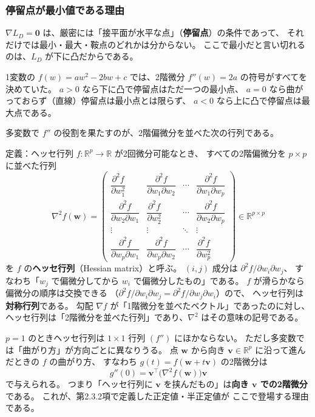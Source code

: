 \subsubsection{停留点が最小値である理由}

$\nabla L_D = \bm{0}$ は、厳密には「接平面が水平な点」（\textbf{停留点}）の条件であって、
それだけでは最小・最大・鞍点のどれかは分からない。
ここで最小だと言い切れるのは、$L_D$ が下に凸だからである。

1変数の $f(w) = aw^2 - 2bw + c$ では、2階微分 $f''(w) = 2a$ の符号がすべてを決めていた。
$a > 0$ なら下に凸で停留点はただ一つの最小点、
$a = 0$ なら曲がっておらず（直線）停留点は最小点とは限らず、
$a < 0$ なら上に凸で停留点は最大点である。

多変数で $f''$ の役割を果たすのが、2階偏微分を並べた次の行列である。

\begin{itembox}[l]{定義：ヘッセ行列}
$f : \mathbb{R}^p \to \mathbb{R}$ が2回微分可能なとき、
すべての2階偏微分を $p \times p$ に並べた行列
\begin{equation}
  \nabla^2 f(\bm{w}) =
  \begin{pmatrix}
    \dfrac{\partial^2 f}{\partial w_1^2} &
    \dfrac{\partial^2 f}{\partial w_1 \partial w_2} & \cdots &
    \dfrac{\partial^2 f}{\partial w_1 \partial w_p} \\[2ex]
    \dfrac{\partial^2 f}{\partial w_2 \partial w_1} &
    \dfrac{\partial^2 f}{\partial w_2^2} & \cdots &
    \dfrac{\partial^2 f}{\partial w_2 \partial w_p} \\
    \vdots & \vdots & \ddots & \vdots \\[1ex]
    \dfrac{\partial^2 f}{\partial w_p \partial w_1} &
    \dfrac{\partial^2 f}{\partial w_p \partial w_2} & \cdots &
    \dfrac{\partial^2 f}{\partial w_p^2}
  \end{pmatrix}
  \in \mathbb{R}^{p \times p}
\end{equation}
を $f$ の\textbf{ヘッセ行列}（Hessian matrix）と呼ぶ。
$(i, j)$ 成分は $\partial^2 f / \partial w_i \partial w_j$、
すなわち「$w_j$ で偏微分してから $w_i$ で偏微分したもの」である。
$f$ が滑らかなら偏微分の順序は交換できる
（$\partial^2 f / \partial w_i \partial w_j = \partial^2 f / \partial w_j \partial w_i$）ので、
ヘッセ行列は\textbf{対称行列}である。
勾配 $\nabla f$ が「1階微分を並べたベクトル」であったのに対し、
ヘッセ行列は「2階微分を並べた行列」であり、$\nabla^2$ はその意味の記号である。
\end{itembox}

$p = 1$ のときヘッセ行列は $1 \times 1$ 行列 $(f'')$ にほかならない。
ただし多変数では「曲がり方」が方向ごとに異なりうる。
点 $\bm{w}$ から向き $\bm{v} \in \mathbb{R}^p$ に沿って進んだときの $f$ の曲がり方、
すなわち $g(t) = f(\bm{w} + t\bm{v})$ の2階微分は
\begin{equation}
  g''(0) = \bm{v}^\top \bigl( \nabla^2 f(\bm{w}) \bigr) \bm{v}
  \label{eq:ch4-directional-curvature}
\end{equation}
で与えられる。
つまり「ヘッセ行列に $\bm{v}$ を挟んだもの」は\textbf{向き $\bm{v}$ での2階微分}である。
これが、第2.3.2項で定義した正定値・半正定値が
ここで登場する理由である。

